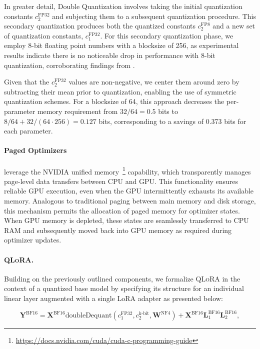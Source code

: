 In greater detail, Double Quantization involves taking the initial quantization constants $c_2^{\text{FP32}}$ and subjecting them to a subsequent quantization procedure. This secondary quantization produces both the quantized constants $c_2^{\text{FP8}}$ and a new set of quantization constants, $c_1^{\text{FP32}}$. For this secondary quantization phase, we employ 8-bit floating point numbers with a blocksize of 256, as experimental results indicate there is no noticeable drop in performance with 8-bit quantization, corroborating findings from \citet{dettmers2022case}. 

Given that the $c_2^{\text{FP32}}$ values are non-negative, we center them around zero by subtracting their mean prior to quantization, enabling the use of symmetric quantization schemes. For a blocksize of 64, this approach decreases the per-parameter memory requirement from $32/64=0.5$ bits to $8/64 + 32/(64\cdot256) = 0.127$ bits, corresponding to a savings of 0.373 bits for each parameter.

\paragraph{Paged Optimizers} leverage the NVIDIA unified memory~\footnote{\tiny \url{https://docs.nvidia.com/cuda/cuda-c-programming-guide}} capability, which transparently manages page-level data transfers between CPU and GPU. This functionality ensures reliable GPU execution, even when the GPU intermittently exhausts its available memory. Analogous to traditional paging between main memory and disk storage, this mechanism permits the allocation of paged memory for optimizer states. When GPU memory is depleted, these states are seamlessly transferred to CPU RAM and subsequently moved back into GPU memory as required during optimizer updates.

\paragraph{\textsc{QLoRA}.} Building on the previously outlined components, we formalize \textsc{QLoRA} in the context of a quantized base model by specifying its structure for an individual linear layer augmented with a single LoRA adapter as presented below:

\begin{equation}
    \mathbf{Y}^{\text{BF16}} =  \mathbf{X}^{\text{BF16}} \text{doubleDequant}(c_1^{\text{FP32}}, c_2^{\text{k-bit}}, \mathbf{W}^{\text{NF4}}) + \mathbf{X}^{\text{BF16}}\mathbf{L}^{\text{BF16}}_1\mathbf{L}^{\text{BF16}}_2,
\end{equation}

